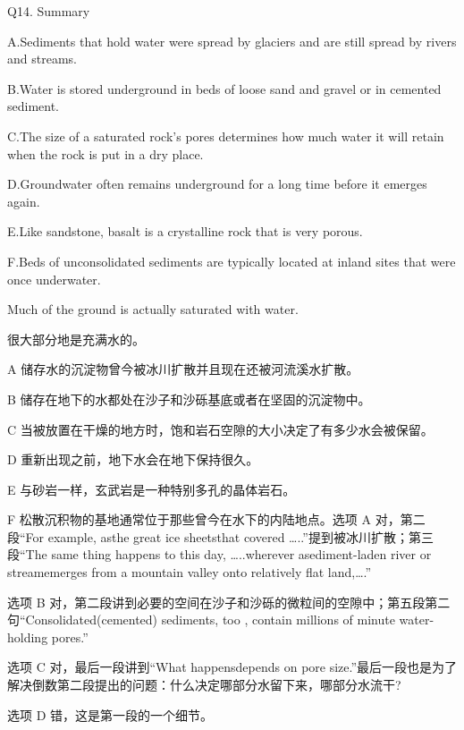 \begin{blk}
  \begin{qst}
    Q14. Summary
  \end{qst}

  \begin{chc}
    A.Sediments that hold water were spread by glaciers and are still spread by rivers and streams.

    B.Water is stored underground in beds of loose sand and gravel or in cemented sediment.

    C.The size of a saturated rock’s pores determines how much water it will retain when the rock is put in a dry place.

    D.Groundwater often remains underground for a long time before it emerges again.

    E.Like sandstone, basalt is a crystalline rock that is very porous.

    F.Beds of unconsolidated sediments are typically located at inland sites that were once underwater.
  \end{chc}

  \begin{nlz}
    Much of the ground is actually saturated with water.

    很大部分地是充满水的。

    A 储存水的沉淀物曾今被冰川扩散并且现在还被河流溪水扩散。

    B 储存在地下的水都处在沙子和沙砾基底或者在坚固的沉淀物中。

    C 当被放置在干燥的地方时，饱和岩石空隙的大小决定了有多少水会被保留。

    D 重新出现之前，地下水会在地下保持很久。

    E 与砂岩一样，玄武岩是一种特别多孔的晶体岩石。

    F 松散沉积物的基地通常位于那些曾今在水下的内陆地点。选项 A 对，第二段“For example, asthe great ice sheetsthat covered …..”提到被冰川扩散；第三段“The same thing happens to this day, …..wherever asediment-laden river or streamemerges from a mountain valley onto relatively flat land,….”

    选项 B 对，第二段讲到必要的空间在沙子和沙砾的微粒间的空隙中；第五段第二句“Consolidated(cemented) sediments, too , contain millions of minute water-holding pores.”

    选项 C 对，最后一段讲到“What happensdepends on pore size.”最后一段也是为了解决倒数第二段提出的问题：什么决定哪部分水留下来，哪部分水流干?

    选项 D 错，这是第一段的一个细节。


\end{nlz}
\end{blk}
